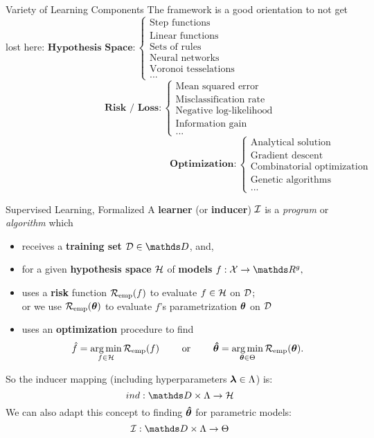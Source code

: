 \documentclass[11pt,compress,t,notes=noshow, xcolor=table]{beamer}
\begin{document}
\begin{frame2}[footnotesize]{Variety of Learning Components}
The framework is a good orientation to not get lost here:
\vfill
$\textbf{Hypothesis Space}:
\begin{cases} 
\text{Step functions} \\
\text{Linear functions}\\
\text{Sets of rules}\\
\text{Neural networks}\\
\text{Voronoi tesselations}\\
\text{...}
\end{cases}$
$\phantom{Hypothesis Space RISK } \textbf{Risk / Loss}: \begin{cases}
\text{Mean squared error}\\
\text{Misclassification rate}\\
\text{Negative log-likelihood}\\
\text{Information gain}\\
\text{...}
\end{cases}$
$\phantom{hypothesis space risk RISK RISK RISK} \textbf{Optimization}: \begin{cases}
\text{Analytical solution}\\
\text{Gradient descent}\\
\text{Combinatorial optimization}\\
\text{Genetic algorithms}\\
\text{...}
\end{cases}$
\end{frame2}


\begin{frame2}{Supervised Learning, Formalized}
A \textbf{learner} (or \textbf{inducer}) $\mathcal{I}$ is a \emph{program} or \emph{algorithm} which
\begin{itemize}
\item receives a \textbf{training set} $\D \in \allDatasets$, and,
\item for a given \textbf{hypothesis space} $\mathcal{H}$ of \textbf{models} $f:\Xspace \rightarrow \R^g,$ 
\item uses a \textbf{risk} function $\mathcal{R}_{\text{emp}}(f)$ to evaluate $f \in \mathcal{H}$ on $\mathcal{D}$;\\ 
or we use $\mathcal{R}_{\text{emp}}(\bm{\theta})$ to evaluate $f$'s parametrization $\bm{\theta}$ on $\mathcal{D}$
\item uses an \textbf{optimization} procedure to find
$$
\hat{f} = \mathop{\mathrm{arg\,min}}_{f \in \mathcal{H}} \mathcal{R}_{\text{emp}}(f) \qquad \text{ or } \qquad \bm{\hat\theta} = \mathop{\mathrm{arg\,min}}_{\bm{\theta} \in \Theta} \mathcal{R}_{\text{emp}}(\bm{\theta}).
$$
\end{itemize}
So the inducer mapping (including hyperparameters $\bm{\lambda} \in \Lambda$) is:
$$
ind: \preimageInducerShort\rightarrow \Hspace
$$
We can also adapt this concept to finding $\bm{\hat\theta}$ for parametric models:
$$
\ind: \preimageInducerShort \rightarrow \Theta
$$
\end{frame2}
\end{document}
